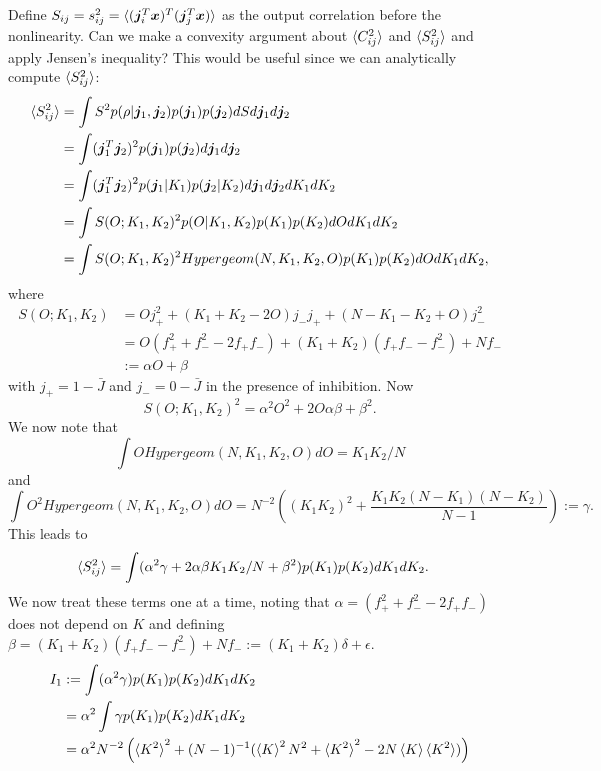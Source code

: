 \documentclass{article}
\renewcommand\b\bm
\begin{document}
Define $S_{ij} = s_{ij}^2 = \braket{(\b{j}_i^T \b{x})^T (\b{j}_j^T \b{x})}$ as the output correlation before the nonlinearity.
Can we make a convexity argument about $\braket{C_{ij}^2}$ and $\braket{S_{ij}^2}$ and apply Jensen's inequality?
This would be useful since we can analytically compute $\braket{S_{ij}^2}$:
\begin{align}
    \braket{S_{ij}^2} &= \int S^2 p(\rho|\b{j}_1, \b{j}_2) p(\b{j}_1) p(\b{j}_2) dS d\b{j}_1 d\b{j}_2\\
    &= \int (\b{j}_1^T \b{j}_2)^2 p(\b{j}_1) p(\b{j}_2) d\b{j}_1 d\b{j}_2\\
    &= \int (\b{j}_1^T \b{j}_2)^2 p(\b{j}_1|K_1) p(\b{j}_2|K_2) d\b{j}_1 d\b{j}_2 dK_1 dK_2\\
    &= \int S(O; K_1, K_2)^2 p(O|K_1, K_2) p(K_1) p(K_2) dO dK_1 dK_2\\
    &= \int S(O; K_1, K_2)^2 Hypergeom(N, K_1, K_2, O) p(K_1) p(K_2) dO dK_1 dK_2,
\end{align}
where 
\begin{align}
    S(O; K_1, K_2) &= O j_+^2 + (K_1 + K_2 - 2O) j_- j_+ + (N - K_1 - K_2 + O) j_-^2\\
    &= O(f_+^2 + f_-^2 - 2 f_+ f_-) + (K_1 + K_2)(f_+ f_- - f_-^2)+Nf_-\\
    &:= \alpha O + \beta
\end{align}
with $j_+ = 1 - \bar{J}$ and $j_- = 0 - \bar{J}$ in the presence of inhibition.
Now
\begin{equation}
    S(O; K_1, K_2)^2 = \alpha^2 O^2 + 2O \alpha \beta + \beta^2.
\end{equation}
We now note that
\begin{equation}
    \int O Hypergeom(N, K_1, K_2, O) dO = K_1 K_2 / N
\end{equation}
and
\begin{equation}
    \int O^2 Hypergeom(N, K_1, K_2, O) dO = 
    N^{-2} \left ( (K_1 K_2)^2 + \frac{K_1 K_2 (N-K_1) (N-K_2)}{N-1} \right ) := \gamma.
\end{equation}
This leads to
\begin{align}
    \braket{S_{ij}^2}
    &= \int (\alpha^2 \gamma + 2\alpha \beta K_1 K_2/N + \beta^2 ) p(K_1) p(K_2) dK_1 dK_2.
\end{align}
We now treat these terms one at a time, noting that $\alpha = (f_+^2 + f_-^2 - 2 f_+ f_-)$ does not depend on $K$ and defining $\beta = (K_1 + K_2)(f_+ f_- - f_-^2)+Nf_- := (K_1+K_2)\delta + \epsilon$.
\begin{align}
    I_1 &:= \int (\alpha^2 \gamma) p(K_1) p(K_2) dK_1 dK_2\\
    &= \alpha^2 \int \gamma p(K_1) p(K_2) dK_1 dK_2\\
    &= \alpha^2 N^{-2} \left ( \braket{K^2}^2 + (N-1)^{-1} (\braket{K}^2 N^2 + \braket{K^2}^2 - 2 N \braket{K} \braket{K^2}) \right )
\end{align}
\end{document}
